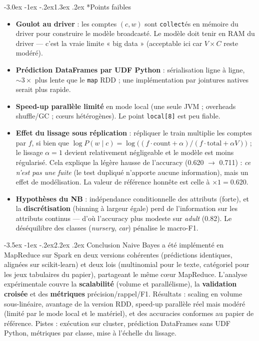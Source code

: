 \documentclass[11pt,a4paper]{article}
\makeatletter
\newcommand{\code}[1]{\lstinline[style=py]!#1!}
\renewcommand\section{\@startsection{section}{1}{\z@}%
  {-3.5ex \@plus -1ex \@minus -.2ex}{2.2ex \@plus.2ex}%
  {\normalfont\Large\bfseries\color{primary}}}
\renewcommand\subsection{\@startsection{subsection}{2}{\z@}%
  {-3.0ex \@plus -1ex \@minus -.2ex}{1.3ex \@plus.2ex}%
  {\normalfont\large\bfseries\color{primary!88!black}}}
\makeatother
\begin{document}
\subsection*{Points faibles}
\begin{itemize}
  \item \textbf{Goulot au driver} : les comptes $(c,w)$ sont \code{collect}és en mémoire du
        driver pour construire le modèle broadcasté. Le modèle doit tenir en RAM du driver ---
        c'est la vraie limite « big data » (acceptable ici car $V\times C$ reste modéré).
  \item \textbf{Prédiction DataFrames par UDF Python} : sérialisation ligne à ligne, ${\sim}3\times$
        plus lente que le \code{map} RDD ; une implémentation par jointures natives serait plus
        rapide.
  \item \textbf{Speed-up parallèle limité} en mode local (une seule JVM ; overheads shuffle/GC ;
        cœurs hétérogènes). Le point \code{local[8]} est peu fiable.
  \item \textbf{Effet du lissage sous réplication} : répliquer le train multiplie les comptes
        par $f$, si bien que $\log P(w\mid c)=\log\big((f\cdot\mathrm{count}+\alpha)/(f\cdot
        \mathrm{total}+\alpha V)\big)$ ; le lissage $\alpha{=}1$ devient relativement négligeable
        et le modèle est moins régularisé. Cela explique la légère hausse de l'accuracy
        (0.620 $\to$ 0.711) : \emph{ce n'est pas une fuite} (le test dupliqué n'apporte aucune
        information), mais un effet de modélisation. La valeur de référence honnête est celle à
        ${\times}1 = 0.620$.
  \item \textbf{Hypothèses du NB} : indépendance conditionnelle des attributs (forte), et la
        \textbf{discrétisation} (binning à largeur égale) perd de l'information sur les attributs
        continus --- d'où l'accuracy plus modeste sur \emph{adult} (0.82). Le déséquilibre des
        classes (\emph{nursery}, \emph{car}) pénalise le macro-F1.
\end{itemize}

\section{Conclusion}
Naive Bayes a été implémenté en MapReduce sur Spark en deux versions cohérentes (prédictions
identiques, alignées sur scikit-learn) et deux lois (multinomial pour le texte, catégoriel
pour les jeux tabulaires du papier), partageant le même cœur MapReduce. L'analyse
expérimentale couvre la \textbf{scalabilité} (volume et parallélisme), la \textbf{validation
croisée} et des \textbf{métriques} précision/rappel/F1. Résultats : scaling en volume
sous-linéaire, avantage de la version RDD, speed-up parallèle réel mais modéré (limité par le
mode local et le matériel), et des accuracies conformes au papier de référence.
Pistes : exécution sur cluster, prédiction DataFrames sans UDF Python, métriques par classe,
mise à l'échelle du lissage.
\end{document}
